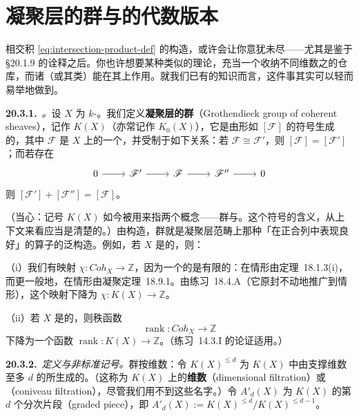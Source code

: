 
\section{凝聚层的\trGrothendieck{}群与\trHomology{}的代数版本}

相交积 \eqref{eq:intersection-product-def} 的构造，或许会让你意犹未尽——尤其是鉴于 \S20.1.9 的\trCohomology{}诠释之后。你也许想要某种类似\trHomology{}的理论，充当一个收纳不同维数之\trCycle{}的仓库，而诸\trLineBundle（或其\trChern{}类）能在其上作用。就我们已有的知识而言，这件事其实可以轻而易举地做到。

\textbf{20.3.1.}\ \emph{\trhDefinition{}。}\quad 设 $X$ 为 $k$-\trVariety。我们定义\textbf{凝聚层的\trGrothendieck{}群}（Grothendieck group of coherent sheaves），记作 $K(X)$（亦常记作 $K_0(X)$），它是由形如 $[\mathscr{F}]$ 的符号生成的\trAbelianGroups，其中 $\mathscr{F}$ 是 $X$ 上的一个\trCoherentSheaf，并受制于如下关系：若 $\mathscr{F}\cong\mathscr{F}'$，则 $[\mathscr{F}]=[\mathscr{F}']$；而若存在\trShortExactSequence
\[
\begin{tikzcd}
0\ar[r]&\mathscr{F}'\ar[r]&\mathscr{F}\ar[r]&\mathscr{F}''\ar[r]&0
\end{tikzcd}
\]
则 $[\mathscr{F}']+[\mathscr{F}'']=[\mathscr{F}]$。

（当心：记号 $K(X)$ 如今被用来指两个概念——\trGrothendieck{}群与\trFunctionField。这个符号的含义，从上下文来看应当是清楚的。）由构造，\trGrothendieck{}群就是凝聚层范畴上那种「在正合列中表现良好」的算子的泛构造。例如，若 $X$ 是\trProper{}的，则：

（i）我们有映射 $\chi\colon\mathit{Coh}_X\to\mathbb{Z}$，因为一个\trCoherentSheaf{}的\trEulerCharacteristic{}是有限的：在\trProjective{}情形由\mbox{定理~18.1.3(i)}，而更一般地，在\trProper{}情形由\mbox{\trGrothendieck{}凝聚定理~18.9.1}。由\mbox{练习~18.4.A}（它原封不动地推广到\trProper{}情形），这个映射下降为 $\chi\colon K(X)\to\mathbb{Z}$。

（ii）若 $X$ 是\trIntegral{}的，则秩函数
\[
\operatorname{rank}\colon\mathit{Coh}_X\longrightarrow\mathbb{Z}
\]
下降为一个函数 $\operatorname{rank}\colon K(X)\to\mathbb{Z}$。（\mbox{练习~14.3.I} 的论证适用。）

\textbf{20.3.2.}\ \emph{定义与非标准记号。}\quad \trGrothendieck{}群按维数\trFiltered：令 $K(X)^{\le d}$ 为 $K(X)$ 中由支撑维数至多 $d$ 的\trCoherentSheaf{}所生成的\trSubgroup。（这称为 $K(X)$ 上的\textbf{维数\trFiltration}（dimensional filtration）或\textbf{\trConiveauFiltration}（coniveau filtration），尽管我们用不到这些名字。）令 $A'_d(X)$ 为 $K(X)$ 的第 $d$ 个分次片段（graded piece），即 $A'_d(X):=K(X)^{\le d}/K(X)^{\le d-1}$。

